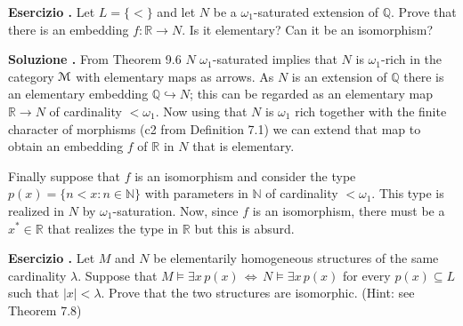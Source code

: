 \documentclass[10pt]{article}
\def\M{\EuScript M}
\def\QQ{\mathds Q}
\def\RR{\mathds R}
\def\E{\exists}
\def\IFF{\Leftrightarrow}
\newcounter{ex}
\newenvironment{exercise}{\clearpage\addtocounter{ex}{1}\textbf{Esercizio \theex.\quad}}{}
\newcounter{sol}
\newenvironment{solution}{\addtocounter{sol}{1}\textbf{Soluzione \theex.\quad}}{}
\begin{document}
   
\begin{exercise}
  Let $L = \{<\}$ and let $N$ be a $\omega_1$-saturated extension of $\QQ$. 
  Prove that there is an embedding $f:\RR \to  N$. Is it elementary? Can it be an isomorphism?
\end{exercise}

\begin{solution}
  From Theorem 9.6 \(N\) \(\omega_1\)-saturated implies that \(N\) is \(\omega_1\)-rich in the category \(\M\) with elementary maps as arrows.
  As \(N\) is an extension of \(\mathbb{Q}\) there is an elementary embedding \(\mathbb{Q}\hookrightarrow N\); this can be regarded as an elementary map \(\mathbb{R}\to N\) of cardinality \(<\omega_1\).
  Now using that \(N\) is \(\omega_1\) rich together with the finite character of morphisms (c2 from Definition 7.1) we can extend that map to obtain an embedding \(f\)
  of \(\mathbb{R}\) in \(N\) that is elementary.

  Finally suppose that \(f\) is an isomorphism and consider the type \(p(x) = \big\{n < x\colon n\in\mathbb{N}\big\}\) with parameters in \(\mathbb{N}\) of cardinality \(<\omega_1\).
  This type is realized in \(N\) by \(\omega_1\)-saturation.
  Now, since \(f\) is an isomorphism, there must be a \(x^*\in\mathbb{R}\) that realizes the type in \(\mathbb{R}\) but this is absurd.
\end{solution}

\begin{exercise}
  Let $M$ and $N$ be elementarily homogeneous structures of the same cardinality $\lambda$. Suppose that $M\models\E x\, p(x)\,\IFF\,N\models\E x\, p(x)$ for every $p(x)\subseteq L$ such that $|x|<\lambda$. Prove that the two structures are isomorphic. (Hint: see Theorem 7.8)
\end{exercise}
\end{document}
